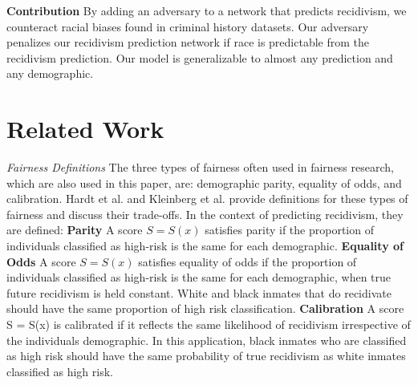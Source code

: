 \documentclass{article}
\begin{document}

\textbf{Contribution} By adding an adversary to a network that predicts recidivism, we counteract racial biases found in criminal history datasets. Our adversary penalizes our recidivism prediction network if race is predictable from the recidivism prediction. Our model is generalizable to almost any prediction and any demographic.

\section{Related Work}
\vspace{-2mm}
\textit{Fairness Definitions} The three types of fairness often used in fairness research, which are also used in this paper, are: demographic parity, equality of odds, and calibration. Hardt et al.  and Kleinberg et al.  provide definitions for these types of fairness and discuss their trade-offs. In the context of predicting recidivism, they are defined:
\newline \textbf{Parity} A score $S = S(x)$ satisfies parity if the proportion of individuals classified as high-risk is the same for each demographic. 
\newline \textbf{Equality of Odds} A score $S = S(x)$ satisfies equality of odds if the proportion of individuals classified as high-risk is the same for each demographic, when true future recidivism is held constant. White and black inmates that do recidivate should have the same proportion of high risk classification.
\newline \textbf{Calibration} A score S = S(x) is calibrated if it reflects the same likelihood of recidivism irrespective of the individual\textquotesingle s demographic. In this application, black inmates who are classified as high risk should have the same probability of true recidivism as white inmates classified as high risk.
\end{document}
